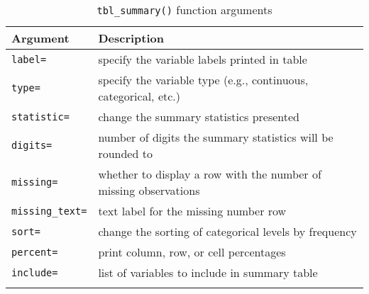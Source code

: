 \captionsetup[table]{labelformat=empty,skip=1pt}
\begin{longtable}{ll}
\toprule
Argument & Description \\ 
\midrule
\texttt{label=} & specify the variable labels printed in table \\ 
\texttt{type=} & specify the variable type (e.g., continuous, categorical, etc.) \\ 
\texttt{statistic=} & change the summary statistics presented \\ 
\texttt{digits=} & number of digits the summary statistics will be rounded to \\ 
\texttt{missing=} & whether to display a row with the number of missing observations \\ 
\texttt{missing\_text=} & text label for the missing number row \\ 
\texttt{sort=} & change the sorting of categorical levels by frequency \\ 
\texttt{percent=} & print column, row, or cell percentages \\ 
\texttt{include=} & list of variables to include in summary table \\ 
\bottomrule\caption{\label{tab:caption}\texttt{tbl\_summary()} function arguments}\\

\end{longtable}

